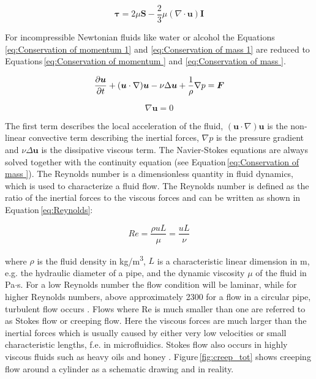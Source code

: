 \begin{equation}
\boldsymbol\tau = 2\mu\boldsymbol S - \frac{2}{3}\mu(\nabla\cdotp\boldsymbol u)\boldsymbol I
\label{eq:stress_tensor}
\end{equation}

For incompressible Newtonian fluids like water or alcohol the Equations\,\ref{eq:Conservation of momentum 1} and \ref{eq:Conservation of mass 1} are reduced to Equations\,\ref{eq:Conservation of momentum } and \ref{eq:Conservation of mass }\cite{versteeg2007introduction}. 

\begin{equation}
{\partial{\boldsymbol u}\over{\partial t}} + ({\boldsymbol u} \cdot \nabla) {\boldsymbol u} - \nu\Delta{\boldsymbol u}+ \frac{1}{\rho}\nabla p = {\boldsymbol F}
\label{eq:Conservation of momentum }
\end{equation}

\begin{equation}
\nabla{\boldsymbol u} = 0
\label{eq:Conservation of mass }
\end{equation}
 
The first term describes the local acceleration of the fluid, $({\boldsymbol u} \cdot \nabla) {\boldsymbol u}$ is the non-linear convective term describing the inertial forces, $\nabla p$ is the pressure gradient and $\nu\Delta{\boldsymbol u}$ is the dissipative viscous term. The Navier-Stokes equations are always solved together with the continuity equation (see Equation\,\ref{eq:Conservation of mass }). 
The Reynolds number is a dimensionless quantity in fluid dynamics, which is used to characterize a fluid flow. The Reynolds number is defined as the ratio of the inertial forces to the viscous forces and can be written as shown in Equation\,\ref{eq:Reynolds}:  

\begin{equation}
Re=\frac{\rho u L}{\mu}=\frac{uL}{\nu}
\label{eq:Reynolds}
\end{equation}

where $\rho$ is the fluid density in kg/m\textsuperscript{3}, $L$ is a characteristic linear dimension in m, e.g. the hydraulic diameter of a pipe, and the dynamic viscosity $\mu$ of the fluid in Pa$\cdotp$s. For a low Reynolds number the flow condition will be laminar, while for higher Reynolds numbers, above approximately 2300 for a flow in a circular pipe, turbulent flow occurs \cite{schwarze2012cfd}. Flows where Re is much smaller than one are referred to as Stokes flow or creeping flow. Here the viscous forces are much larger than the inertial forces which is usually caused by either very low velocities or small characteristic lengths, f.e. in microfluidics. Stokes flow also occurs in highly viscous fluids such as heavy oils and honey \cite{lautrup2004physics}. Figure\,\ref{fig:creep_tot} shows creeping flow around a cylinder as a schematic drawing and in reality. 

